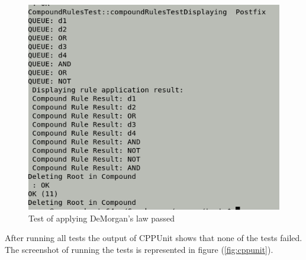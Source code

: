 \documentclass[10pt, a4paper, titlepage]{article}
\begin{document}
\begin{figure}[h]
\centering
\includegraphics[scale=0.6]{images/demorganTest.png}
\caption{Test of applying DeMorgan's law passed}
\label{fig:demorganTest}
\end{figure}

After running all tests the output of CPPUnit shows that none of the tests failed. The screenshot of running the tests is represented in figure (\ref{fig:cppunit}).
\end{document}
